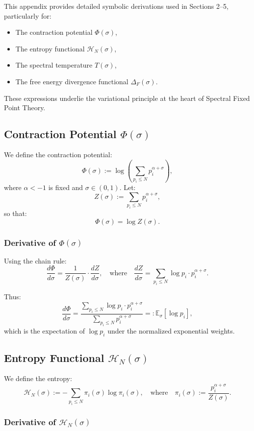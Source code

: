 \documentclass[12pt]{article}
\begin{document}
This appendix provides detailed symbolic derivations used in Sections 2–5, particularly for:
\begin{itemize}
    \item The contraction potential $\Phi(\sigma)$,
    \item The entropy functional $\mathcal{H}_N(\sigma)$,
    \item The spectral temperature $T(\sigma)$,
    \item The free energy divergence functional $\Delta_F(\sigma)$.
\end{itemize}
These expressions underlie the variational principle at the heart of Spectral Fixed Point Theory.

\subsection{Contraction Potential $\Phi(\sigma)$}

We define the contraction potential:
\[
\Phi(\sigma) := \log \left( \sum_{p_i \le N} p_i^{\alpha + \sigma} \right),
\]
where $\alpha < -1$ is fixed and $\sigma \in (0,1)$. Let:
\[
Z(\sigma) := \sum_{p_i \le N} p_i^{\alpha + \sigma},
\]
so that:
\[
\Phi(\sigma) = \log Z(\sigma).
\]

\subsubsection*{Derivative of $\Phi(\sigma)$}

Using the chain rule:
\[
\frac{d\Phi}{d\sigma} = \frac{1}{Z(\sigma)} \cdot \frac{dZ}{d\sigma}, \quad \text{where} \quad \frac{dZ}{d\sigma} = \sum_{p_i \le N} \log p_i \cdot p_i^{\alpha + \sigma}.
\]

Thus:
\[
\frac{d\Phi}{d\sigma} = \frac{\sum_{p_i \le N} \log p_i \cdot p_i^{\alpha + \sigma}}{\sum_{p_i \le N} p_i^{\alpha + \sigma}} =: \mathbb{E}_{\sigma}[\log p_i],
\]
which is the expectation of $\log p_i$ under the normalized exponential weights.

\subsection{Entropy Functional $\mathcal{H}_N(\sigma)$}

We define the entropy:
\[
\mathcal{H}_N(\sigma) := - \sum_{p_i \le N} \pi_i(\sigma) \log \pi_i(\sigma), \quad \text{where} \quad \pi_i(\sigma) := \frac{p_i^{\alpha + \sigma}}{Z(\sigma)}.
\]

\subsubsection*{Derivative of $\mathcal{H}_N(\sigma)$}
\end{document}
